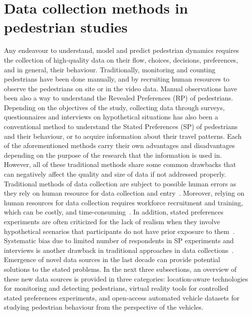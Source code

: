 \section{Data collection methods in pedestrian studies}
\label{chap1b:sec1}
Any endeavour to understand, model and predict pedestrian dynamics requires the collection of high-quality data on their flow, choices, decisions, preferences, and in general, their behaviour. Traditionally, monitoring and counting pedestrians have been done manually, and by recruiting human resources to observe the pedestrians on site or in the video data. Manual observations have been also a way to understand the Revealed Preferences (RP) of pedestrians. Depending on the objectives of the study, collecting data through surveys, questionnaires and interviews on hypothetical situations has also been a conventional method to understand the Stated Preferences (SP) of pedestrians and their behaviour, or to acquire information about their travel patterns. Each of the aforementioned methods carry their own advantages and disadvantages depending on the purpose of the research that the information is used in. However, all of these traditional methods share some common drawbacks that can negatively affect the quality and size of data if not addressed properly. Traditional methods of data collection are subject to possible human errors as they rely on human resource for data collection and entry~\cite{ryus2014guidebook}. Moreover, relying on human resources for data collection requires workforce recruitment and training, which can be costly, and time-consuming~\cite{lee2017emerging}. In addition, stated preferences experiments are often criticized for the lack of realism when they involve hypothetical scenarios that participants do not have prior exposure to them~\cite{farooq2018virtual}. Systematic bias due to limited number of respondents in SP experiments and interviews is another drawback in traditional approaches in data collections~\cite{wardman1988comparison}. Emergence of novel data sources in the last decade can provide potential solutions to the stated problems. In the next three subsections, an overview of these new data sources is provided in three categories: location-aware technologies for monitoring and detecting pedestrians, virtual reality tools for controlled stated preferences experiments, and open-access automated vehicle datasets for studying pedestrian behaviour from the perspective of the vehicles.       
